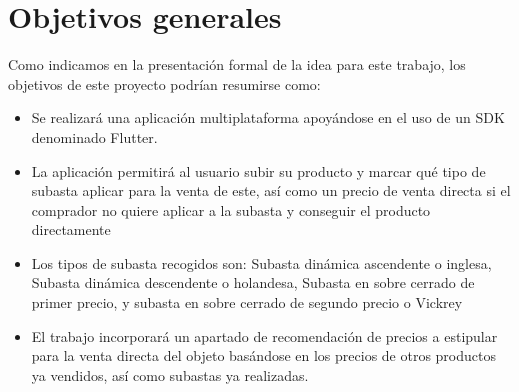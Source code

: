 
\section{Objetivos generales}

	Como indicamos en la presentación formal de la idea para este trabajo, los objetivos de este proyecto podrían resumirse como:
	
\begin{itemize}
	\item Se realizará una aplicación multiplataforma apoyándose en el uso de un SDK denominado Flutter.
	\item La aplicación permitirá al usuario subir su producto y marcar qué tipo de subasta aplicar para la venta de este, así como un precio de venta directa si el comprador no quiere aplicar a la subasta y conseguir el producto directamente
	\item Los tipos de subasta recogidos son: Subasta dinámica ascendente o inglesa, Subasta dinámica descendente o holandesa, Subasta en sobre cerrado de primer precio, y subasta en sobre cerrado de segundo precio o Vickrey
	\item El trabajo incorporará un apartado de recomendación de precios a estipular para la venta directa del objeto basándose en los precios de otros productos ya vendidos, así como subastas ya realizadas.
\end{itemize}

